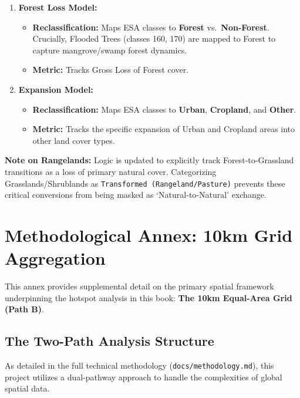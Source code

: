 \documentclass[
  letterpaper,
  DIV=11,
  numbers=noendperiod]{scrreprt}
\providecommand{\tightlist}{%
  \setlength{\itemsep}{0pt}\setlength{\parskip}{0pt}}
\begin{document}
\begin{enumerate}
\def\labelenumi{\arabic{enumi}.}
\tightlist
\item
  \textbf{Forest Loss Model:}

  \begin{itemize}
  \tightlist
  \item
    \textbf{Reclassification:} Maps ESA classes to \textbf{Forest}
    vs.~\textbf{Non-Forest}. Crucially, Flooded Trees (classes 160, 170)
    are mapped to Forest to capture mangrove/swamp forest dynamics.
  \item
    \textbf{Metric:} Tracks Gross Loss of Forest cover.
  \end{itemize}
\item
  \textbf{Expansion Model:}

  \begin{itemize}
  \tightlist
  \item
    \textbf{Reclassification:} Maps ESA classes to \textbf{Urban},
    \textbf{Cropland}, and \textbf{Other}.
  \item
    \textbf{Metric:} Tracks the specific expansion of Urban and Cropland
    areas into other land cover types.
  \end{itemize}
\end{enumerate}

\textbf{Note on Rangelands:} Logic is updated to explicitly track
Forest-to-Grassland transitions as a loss of primary natural cover.
Categorizing Grasslands/Shrublands as
\texttt{Transformed\ (Rangeland/Pasture)} prevents these critical
conversions from being masked as `Natural-to-Natural' exchange.

\chapter{Methodological Annex: 10km Grid Aggregation}\label{sec-annex}

This annex provides supplemental detail on the primary spatial framework
underpinning the hotspot analysis in this book: \textbf{The 10km
Equal-Area Grid (Path B)}.

\section{The Two-Path Analysis
Structure}\label{the-two-path-analysis-structure}

As detailed in the full technical methodology
(\texttt{docs/methodology.md}), this project utilizes a dual-pathway
approach to handle the complexities of global spatial data.
\end{document}
